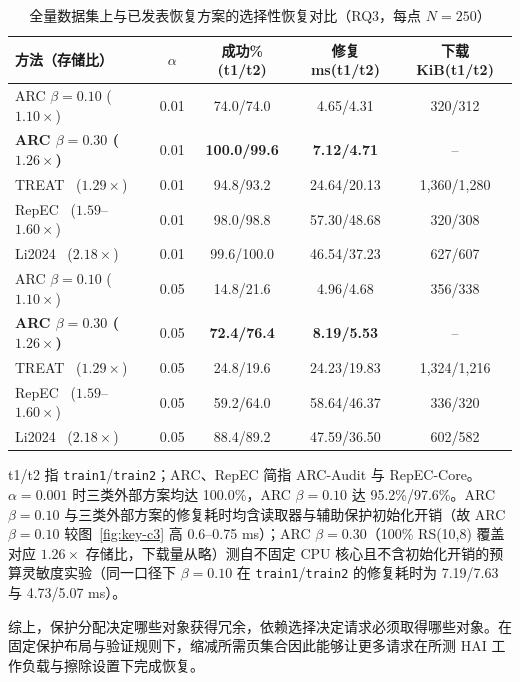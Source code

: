 \documentclass[10pt,journal]{IEEEtran}
\newcommand{\tabnote}[1]{\par\smallskip\parbox{\linewidth}{\footnotesize #1}}
\begin{document}
\begin{table}[t]\centering\scriptsize
\caption{全量数据集上与已发表恢复方案的选择性恢复对比（RQ3，每点 $N{=}250$）}\label{tab:rq3-ext}
\setlength{\tabcolsep}{1.8pt}
\begin{tabular}{@{}lcccc@{}}\toprule
方法（存储比） & $\alpha$ & 成功\%(t1/t2) & 修复ms(t1/t2) & 下载KiB(t1/t2)\\\midrule
ARC $\beta{=}0.10$ ($1.10\times$) & 0.01 & 74.0/74.0 & 4.65/4.31 & 320/312\\
\textbf{ARC $\beta{=}0.30$ ($1.26\times$)} & 0.01 & \textbf{100.0/99.6} & \textbf{7.12/4.71} & --\\
TREAT~\cite{Taurone2024TREAT} ($1.29\times$) & 0.01 & 94.8/93.2 & 24.64/20.13 & 1,360/1,280\\
RepEC~\cite{Zuo2022RepECPlus} ($1.59$--$1.60\times$) & 0.01 & 98.0/98.8 & 57.30/48.68 & 320/308\\
Li2024~\cite{Li2024TNSE} ($2.18\times$) & 0.01 & 99.6/100.0 & 46.54/37.23 & 627/607\\\midrule
ARC $\beta{=}0.10$ ($1.10\times$) & 0.05 & 14.8/21.6 & 4.96/4.68 & 356/338\\
\textbf{ARC $\beta{=}0.30$ ($1.26\times$)} & 0.05 & \textbf{72.4/76.4} & \textbf{8.19/5.53} & --\\
TREAT~\cite{Taurone2024TREAT} ($1.29\times$) & 0.05 & 24.8/19.6 & 24.23/19.83 & 1,324/1,216\\
RepEC~\cite{Zuo2022RepECPlus} ($1.59$--$1.60\times$) & 0.05 & 59.2/64.0 & 58.64/46.37 & 336/320\\
Li2024~\cite{Li2024TNSE} ($2.18\times$) & 0.05 & 88.4/89.2 & 47.59/36.50 & 602/582\\\bottomrule
\end{tabular}
\tabnote{t1/t2 指 \texttt{train1}/\texttt{train2}；ARC、RepEC 简指 ARC-Audit 与 RepEC-Core。$\alpha{=}0.001$ 时三类外部方案均达 100.0\%，ARC $\beta{=}0.10$ 达 95.2\%/97.6\%。ARC $\beta{=}0.10$ 与三类外部方案的修复耗时均含读取器与辅助保护初始化开销（故 ARC $\beta{=}0.10$ 较图~\ref{fig:key-c3} 高 0.6--0.75 ms）；ARC $\beta{=}0.30$（100\% RS(10,8) 覆盖对应 $1.26\times$ 存储比，下载量从略）测自不固定 CPU 核心且不含初始化开销的预算灵敏度实验（同一口径下 $\beta{=}0.10$ 在 \texttt{train1}/\texttt{train2} 的修复耗时为 7.19/7.63 与 4.73/5.07 ms）。}
\end{table}

综上，保护分配决定哪些对象获得冗余，依赖选择决定请求必须取得哪些对象。在固定保护布局与验证规则下，缩减所需页集合因此能够让更多请求在所测 HAI 工作负载与擦除设置下完成恢复。
\end{document}

